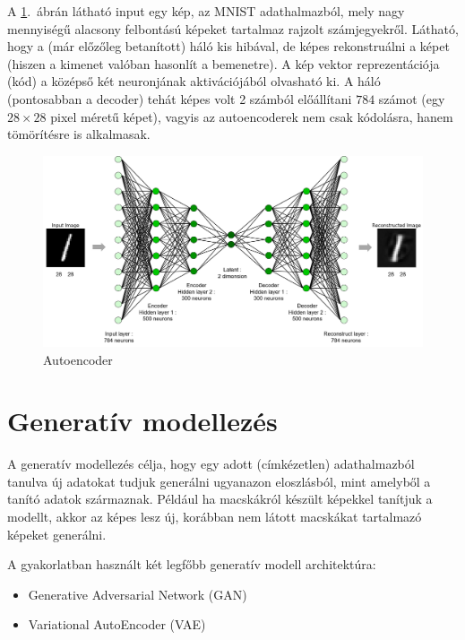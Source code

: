 A \ref{AE_arch2}.~ábrán látható input egy kép, az MNIST adathalmazból, mely nagy mennyiségű alacsony felbontású képeket tartalmaz rajzolt számjegyekről. Látható, hogy a (már előzőleg betanított) háló kis hibával, de képes rekonstruálni a képet (hiszen a kimenet valóban hasonlít a bemenetre). A kép vektor reprezentációja (kód) a középső két neuronjának aktivációjából olvasható ki. A háló (pontosabban a decoder) tehát képes volt 2 számból előállítani $784$ számot (egy $28\times 28$ pixel méretű képet), vagyis az autoencoderek nem csak kódolásra, hanem tömörítésre is alkalmasak.

\begin{figure}[h!]
\begin{center}
  
 
 \begin{center}
	\includegraphics[width=\linewidth]{AE_arch2.png}
 \end{center}

  \caption{Autoencoder \cite{Autoencoder}}\label{AE_arch2}
\end{center}
\end{figure}

\section{Generatív modellezés}

A generatív modellezés célja, hogy egy adott (címkézetlen) adathalmazból tanulva új adatokat tudjuk generálni ugyanazon eloszlásból, mint amelyből a tanító adatok származnak. Például ha macskákról készült képekkel tanítjuk a modellt, akkor az képes lesz új, korábban nem látott macskákat tartalmazó képeket generálni.

A gyakorlatban használt két legfőbb generatív modell architektúra:
\begin{itemize}
  \item Generative Adversarial Network (GAN)
  \item Variational AutoEncoder (VAE)
\end{itemize}


